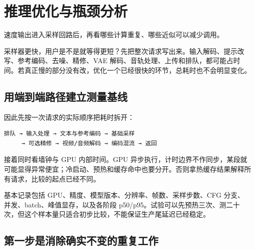 \chapter{推理优化与瓶颈分析}\label{seedance-m10}

速度输出进入采样回路后，再看哪些计算重复、哪些近似可以减少调用。

采样器更快，用户是不是就等得更短？先把整次请求写出来。输入解码、提示改写、参考编码、去噪、精修、VAE 解码、音轨处理、上传和排队，都可能占时间。若真正慢的部分没有改，优化一个已经很快的环节，总耗时也不会明显变化。

\section{用端到端路径建立测量基线}\label{seedance-m10-ux7528ux7aefux5230ux7aefux8defux5f84ux5efaux7acbux6d4bux91cfux57faux7ebf}

因此先按一次请求的实际顺序把耗时拆开：

\begin{verbatim}
排队 → 输入处理 → 文本与参考编码 → 基础采样
     → 可选精修 → 视频/音频解码 → 编码混流 → 返回
\end{verbatim}

接着同时看墙钟与 GPU 内部时间。GPU 异步执行，计时边界不作同步，某段就可能显得异常便宜；冷启动、预热和缓存命中也要分开。否则拿热缓存结果解释所有请求，比较的起点已经不同。

基本记录包括 GPU、精度、模型版本、分辨率、帧数、采样步数、CFG 分支、并发、batch、峰值显存，以及各阶段 p50/p95。试验可以先预热三次、测二十次，但这个样本量只适合初步比较，不能保证生产尾延迟已经稳定。

\section{第一步是消除确实不变的重复工作}\label{seedance-m10-ux7b2cux4e00ux6b65ux662fux6d88ux9664ux786eux5b9eux4e0dux53d8ux7684ux91cdux590dux5de5ux4f5c}

